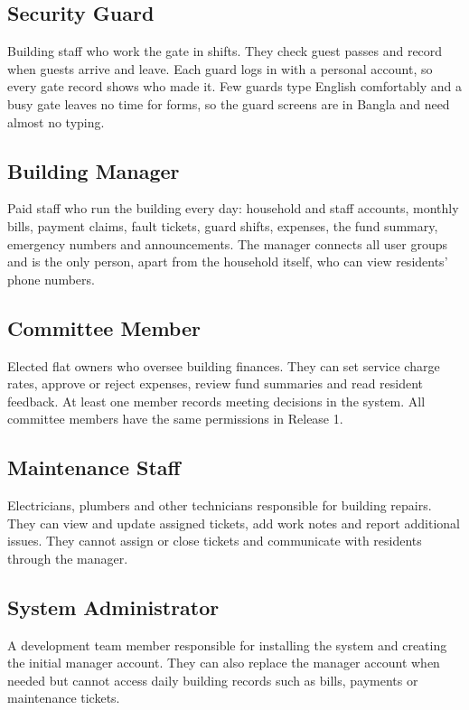 \documentclass[11pt,a4paper]{report}
\begin{document}
\subsection{Security Guard}

Building staff who work the gate in shifts. They check guest passes and record when guests arrive and leave. Each guard logs in with a personal account, so every gate record shows who made it. Few guards type English comfortably and a busy gate leaves no time for forms, so the guard screens are in Bangla and need almost no typing.

\subsection{Building Manager}

Paid staff who run the building every day: household and staff accounts, monthly bills, payment claims, fault tickets, guard shifts, expenses, the fund summary, emergency numbers and announcements. The manager connects all user groups and is the only person, apart from the household itself, who can view residents' phone numbers.

\subsection{Committee Member}

Elected flat owners who oversee building finances. They can set service charge rates, approve or reject expenses, review fund summaries and read resident feedback. At least one member records meeting decisions in the system. All committee members have the same permissions in Release 1.

\subsection{Maintenance Staff}

Electricians, plumbers and other technicians responsible for building repairs. They can view and update assigned tickets, add work notes and report additional issues. They cannot assign or close tickets and communicate with residents through the manager.

\subsection{System Administrator}

A development team member responsible for installing the system and creating the initial manager account. They can also replace the manager account when needed but cannot access daily building records such as bills, payments or maintenance tickets.
\end{document}
